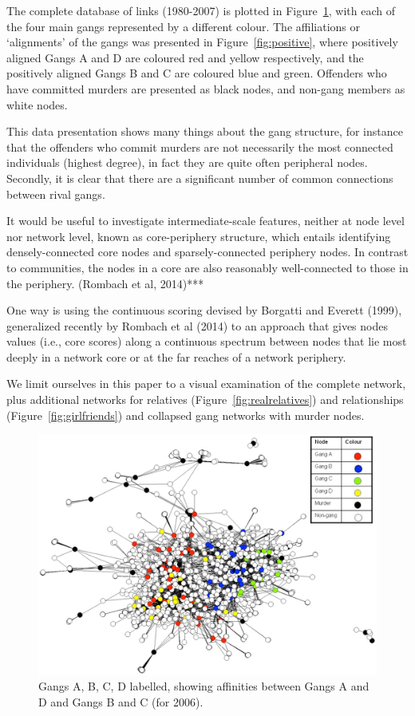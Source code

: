 \documentclass[twocolumn]{svjour3}          %
\theoremstyle{definition}
\begin{document}
The complete database of links (1980-2007) is plotted in
Figure~\ref{fig:legend2006}, with each of the four main gangs
represented by a different colour. The affiliations or `alignments' of
the gangs was presented in Figure~\ref{fig:positive}, where positively
aligned Gangs A and D are coloured red and yellow respectively, and
the positively aligned Gangs B and C are coloured blue and
green. Offenders who have committed murders are presented as black
nodes, and non-gang members as white nodes.

This data presentation shows many things about the gang structure, for
instance that the offenders who commit murders are not necessarily the
most connected individuals (highest degree), in fact they are quite
often peripheral nodes. Secondly, it is clear that there are a
significant number of common connections between rival gangs.

It would be useful to investigate intermediate-scale features, neither
at node level nor network level, known as core-periphery structure,
which entails identifying densely-connected core nodes and
sparsely-connected periphery nodes. In contrast to communities, the
nodes in a core are also reasonably well-connected to those in the
periphery. (Rombach et al, 2014)***

One way is using the continuous scoring devised by Borgatti and
Everett (1999), generalized recently by Rombach et al (2014) to an
approach that gives nodes values (i.e., core scores) along a
continuous spectrum between nodes that lie most deeply in a network
core or at the far reaches of a network periphery.

We limit ourselves in this paper to a visual examination of the
complete network, plus additional networks for relatives
(Figure~\ref{fig:realrelatives}) and relationships
(Figure~\ref{fig:girlfriends}) and collapsed gang networks with murder
nodes.


\begin{figure}[htb]
\centering
\includegraphics[width=\columnwidth]{images/legend2006}
\caption{Gangs A, B, C, D labelled, showing affinities between Gangs A
  and D and Gangs B and C (for 2006).}
\label{fig:legend2006} 
\end{figure}
\end{document}
